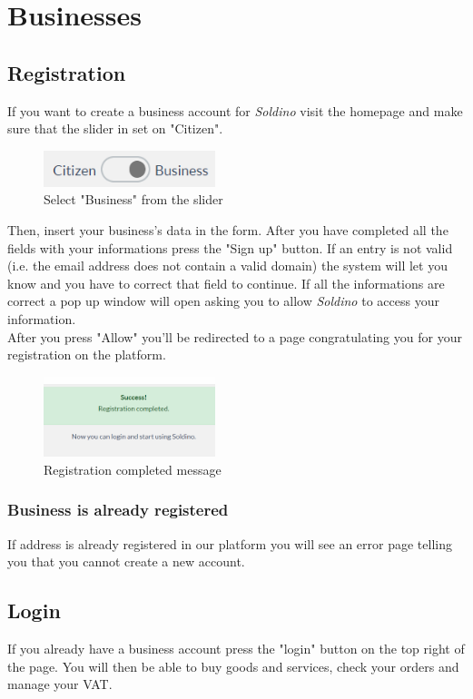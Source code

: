 \section{Businesses}
	\subsection{Registration}
	If you want to create a business account for \textit{Soldino} 
	visit the homepage and make sure that the slider in set on "Citizen".\\
	\begin{figure}[H]
		\includegraphics[width=5cm]{res/images/user_business.png}
		\centering
		\caption{Select "Business" from the slider}
	\end{figure}	
	Then, insert your business's data in the form. After you have completed 
	all the	fields with your informations press the "Sign up" button. If an 
	entry is not valid (i.e. the email address does not contain a valid 
	domain) the system will let you know and you have to correct that field 
	to continue. If all the informations are correct a pop up window will open 
	asking you to allow \textit{Soldino} to access your information.\\
	After you press "Allow" you'll be redirected to a page congratulating you 
	for your registration on the platform.
	\begin{figure}[H]
		\includegraphics[width=5cm]{res/images/registration_complete.png}
		\centering
		\caption{Registration completed message}
	\end{figure}
	\subsubsection{Business is already registered}
	If  address is already registered in our platform you will see an
	error page telling you that you cannot create a new account.
	\subsection{Login}
	If you already have a business account press the "login" button on the 
	top right of the page. You will then be able to buy goods and services, 
	check your orders and manage your VAT.
